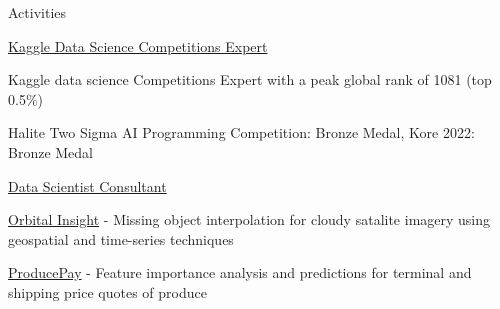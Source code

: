 \documentclass{resume} %
\begin{document}
\begin{rSection}{Activities}

\begin{rSubsection}{\href{https://www.kaggle.com/evilpegasus}{Kaggle Data Science Competitions Expert}}{}{}{}
    \item Kaggle data science Competitions Expert with a peak global rank of 1081 (top 0.5\%)
    \item Halite Two Sigma AI Programming Competition: Bronze Medal, Kore 2022: Bronze Medal
\end{rSubsection}


\begin{rSubsection}{\href{https://saas.berkeley.edu/}{Data Scientist Consultant}}{}{}{}
    \item \href{https://orbitalinsight.com/}{Orbital Insight} - Missing object interpolation for cloudy satalite imagery using geospatial and time-series techniques
    \item \href{https://producepay.com/}{ProducePay} - Feature importance analysis and predictions for terminal and shipping price quotes of produce
\end{rSubsection}




\end{rSection}
\end{document}
